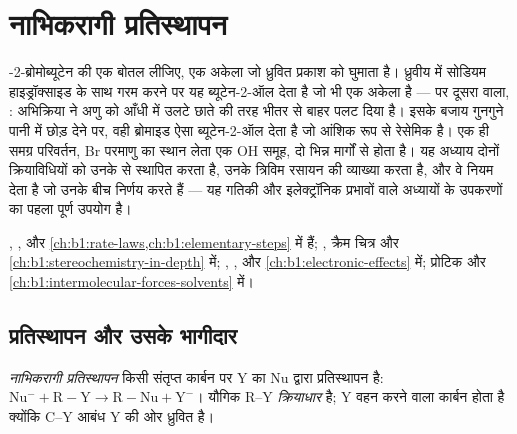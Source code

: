 \chapter{नाभिकरागी प्रतिस्थापन}\label{ch:b1:nucleophilic-substitution}

-2-ब्रोमोब्यूटेन की एक बोतल लीजिए, एक अकेला  जो
ध्रुवित प्रकाश को घुमाता है। ध्रुवीय  में सोडियम हाइड्रॉक्साइड के साथ गरम करने पर
यह ब्यूटेन-2-ऑल देता है जो भी एक अकेला  है --- पर दूसरा वाला,
: अभिक्रिया ने अणु को आँधी में उलटे छाते की तरह भीतर से बाहर
पलट दिया है। इसके बजाय गुनगुने पानी में छोड़ देने पर, वही ब्रोमाइड ऐसा
ब्यूटेन-2-ऑल देता है जो आंशिक रूप से रेसेमिक है। एक ही समग्र परिवर्तन, Br परमाणु का
स्थान लेता एक OH समूह, दो भिन्न मार्गों से होता है। यह अध्याय
दोनों क्रियाविधियों को उनके  से स्थापित करता है, उनके
त्रिविम रसायन की व्याख्या करता है, और वे नियम देता है जो उनके बीच निर्णय करते हैं --- यह
गतिकी और इलेक्ट्रॉनिक प्रभावों वाले अध्यायों के उपकरणों का
पहला पूर्ण उपयोग है।

\begin{recall}
, ,  और
 \cref{ch:b1:rate-laws,ch:b1:elementary-steps} में हैं;
, क्रैम चित्र और 
\cref{ch:b1:stereochemistry-in-depth} में; , ,
 और  \cref{ch:b1:electronic-effects} में;
प्रोटिक और  \cref{ch:b1:intermolecular-forces-solvents} में।
\end{recall}

\section{प्रतिस्थापन और उसके भागीदार}

\begin{definition}[नाभिकरागी प्रतिस्थापन, क्रियाधार]\label{def:b1:nucleophilic-substitution:substitution}
\emph{नाभिकरागी प्रतिस्थापन}
किसी संतृप्त कार्बन पर  Y का  Nu द्वारा
प्रतिस्थापन है: $\mathrm{Nu^-} + \mathrm{R{-}Y} \to \mathrm{R{-}Nu} +
\mathrm{Y^-}$। यौगिक R--Y \emph{क्रियाधार} है;
Y वहन करने वाला कार्बन  होता है क्योंकि C--Y आबंध
Y की ओर ध्रुवित है।
\end{definition}

